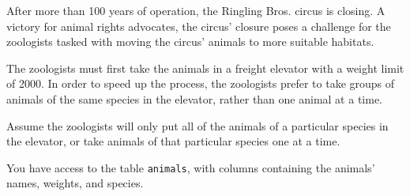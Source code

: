 After more than 100 years of operation, the Ringling Bros. circus is closing.  A victory for animal rights advocates, the circus' closure poses a challenge for the zoologists tasked with moving the circus' animals to more suitable habitats.
 
The zoologists must first take the animals in a freight elevator with a weight limit of 2000.  In order to speed up the process, the zoologists prefer to take groups of animals of the same species in the elevator, rather than one animal at a time.  

Assume the zoologists will only put all of the animals of a particular species in the elevator, or take animals of that particular species one at a time.

You have access to the table \lstinline$animals$, with columns containing the animals' names, weights, and species.
